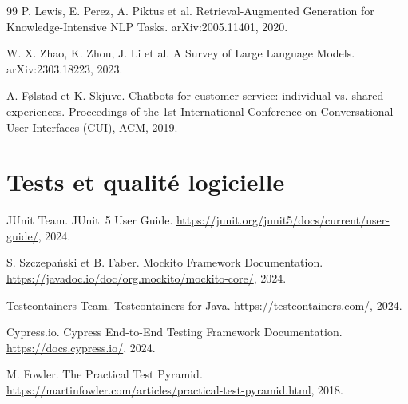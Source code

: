 \documentclass[12pt,a4paper]{report}
\begin{document}
\begin{thebibliography}{99}
P. Lewis, E. Perez, A. Piktus et al.
Retrieval-Augmented Generation for Knowledge-Intensive NLP Tasks.
arXiv:2005.11401, 2020.

W. X. Zhao, K. Zhou, J. Li et al.
A Survey of Large Language Models.
arXiv:2303.18223, 2023.

A. Følstad et K. Skjuve.
Chatbots for customer service: individual vs. shared experiences.
Proceedings of the 1st International Conference on Conversational User Interfaces (CUI), ACM, 2019.

\section*{Tests et qualité logicielle}

JUnit Team.
JUnit~5 User Guide.
\url{https://junit.org/junit5/docs/current/user-guide/}, 2024.

S. Szczepański et B. Faber.
Mockito Framework Documentation.
\url{https://javadoc.io/doc/org.mockito/mockito-core/}, 2024.

Testcontainers Team.
Testcontainers for Java.
\url{https://testcontainers.com/}, 2024.

Cypress.io.
Cypress End-to-End Testing Framework Documentation.
\url{https://docs.cypress.io/}, 2024.

M. Fowler.
The Practical Test Pyramid.
\url{https://martinfowler.com/articles/practical-test-pyramid.html}, 2018.

\end{thebibliography}
\endgroup
\end{document}
